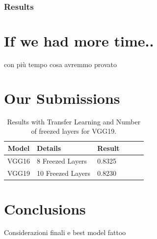 \documentclass[10pt]{article}
\begin{document}
\subsubsection{Results}



\section{If we had more time..}
con più tempo cosa avremmo provato




\section{Our Submissions}
\begin{table}[ht]
\centering
\begin{adjustbox}{width=240}
\small
\begin{tabular}{|c|l|l|l|l|l}

\hline \bf Model & \bf Details & \bf Result \\ \hline
VGG16 & 8 Freezed Layers & 0.8325 \\
VGG19 & 10 Freezed Layers & 0.8230 \\
\hline
\end{tabular}
\end{adjustbox}
\caption{Results with Transfer Learning and Number of freezed layers for VGG19.}
\end{table}
\section{Conclusions}
Considerazioni finali e best model fattoo

\end{document}
